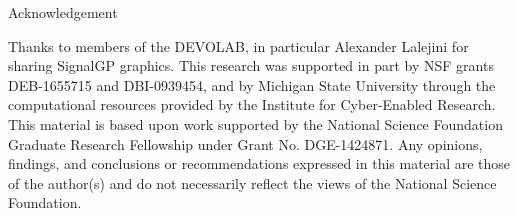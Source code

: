 \begin{block}{Acknowledgement}
{\footnotesize
Thanks to members of the DEVOLAB, in particular Alexander Lalejini for sharing SignalGP graphics.
This research was supported in part by NSF grants DEB-1655715 and DBI-0939454, and by Michigan State University through the computational resources provided by the Institute for Cyber-Enabled Research.
This material is based upon work supported by the National Science Foundation Graduate Research Fellowship under Grant No. DGE-1424871.
Any opinions, findings, and conclusions or recommendations expressed in this material are those of the author(s) and do not necessarily reflect the views of the National Science Foundation.\par
}
\end{block}

